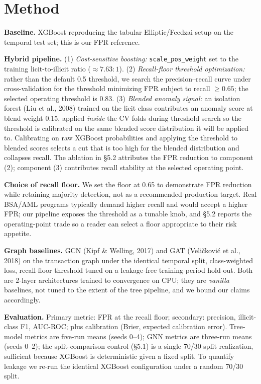 \documentclass[11pt]{article}
\begin{document}
\section{Method}

\textbf{Baseline.} XGBoost reproducing the tabular Elliptic/Feedzai setup on the temporal test set; this is our FPR reference.

\textbf{Hybrid pipeline.} (1) \emph{Cost-sensitive boosting:} \texttt{scale\_pos\_weight} set to the training licit-to-illicit ratio ($\approx 7.63{:}1$). (2) \emph{Recall-floor threshold optimization:} rather than the default 0.5 threshold, we search the precision--recall curve under cross-validation for the threshold minimizing FPR subject to recall $\geq 0.65$; the selected operating threshold is 0.83. (3) \emph{Blended anomaly signal:} an isolation forest (Liu et al., 2008) trained on the licit class contributes an anomaly score at blend weight 0.15, applied \emph{inside} the CV folds during threshold search so the threshold is calibrated on the same blended score distribution it will be applied to. Calibrating on raw XGBoost probabilities and applying the threshold to blended scores selects a cut that is too high for the blended distribution and collapses recall. The ablation in \S5.2 attributes the FPR reduction to component (2); component (3) contributes recall stability at the selected operating point.

\textbf{Choice of recall floor.} We set the floor at 0.65 to demonstrate FPR reduction while retaining majority detection, not as a recommended production target. Real BSA/AML programs typically demand higher recall and would accept a higher FPR; our pipeline exposes the threshold as a tunable knob, and \S5.2 reports the operating-point trade so a reader can select a floor appropriate to their risk appetite.

\textbf{Graph baselines.} GCN (Kipf \& Welling, 2017) and GAT (Veli\v{c}kovi\'{c} et al., 2018) on the transaction graph under the identical temporal split, class-weighted loss, recall-floor threshold tuned on a leakage-free training-period hold-out. Both are 2-layer architectures trained to convergence on CPU; they are \emph{vanilla} baselines, not tuned to the extent of the tree pipeline, and we bound our claims accordingly.

\textbf{Evaluation.} Primary metric: FPR at the recall floor; secondary: precision, illicit-class F1, AUC-ROC; plus calibration (Brier, expected calibration error). Tree-model metrics are five-run means (seeds 0--4); GNN metrics are three-run means (seeds 0--2); the split-comparison control (\S5.1) is a single 70/30 split realization, sufficient because XGBoost is deterministic given a fixed split. To quantify leakage we re-run the identical XGBoost configuration under a random 70/30 split.
\end{document}
